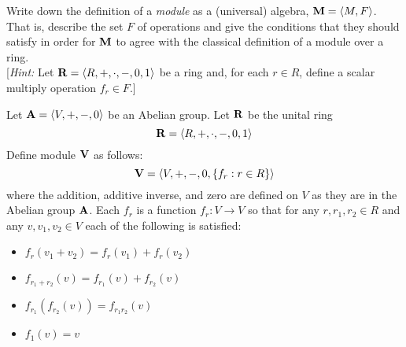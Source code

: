 \begin{problem}
Write down the definition of a \emph{module} as a (universal) algebra, 
$\mathbf{M} = \langle M, F\rangle$.  That is, describe the set $F$ of operations and 
give the conditions that they should satisfy in order for $\mathbf{M}$ to 
agree with the classical definition of a module over a ring.\\[4pt]
[{\it Hint:} Let $\mathbf{R} = \langle R, +, \cdot, -, 0, 1\rangle$ be a ring and, for each $r\in R$, define a scalar multiply operation $f_r \in F$.]
\end{problem}

\begin{solution}
Let $\mathbf{A} = \langle V, +, -, 0\rangle$ be an Abelian group. 
Let $\mathbf{R}$ be the unital ring 
\[\mathbf{R} = \langle R, +, \cdot, -, 0, 1\rangle\]
Define module $\mathbf{V}$ as follows: 
\[\mathbf{V}=\langle V, +, -, 0, \{f_r: r\in R\}\rangle\] 
where the addition, additive inverse, and zero are defined on $V$ as they are in the Abelian group $\mathbf{A}$.
Each $f_r$ is a function $f_r: V\rightarrow V$ so that for any $r, r_1, r_2\in R$ and any $v, v_1, v_2\in V$ each of the following is satisfied: 
	\begin{itemize}
	\item $f_r(v_1+v_2)=f_r(v_1) + f_r(v_2)$
	\item $f_{r_1+r_2}(v) = f_{r_1}(v) + f_{r_2}(v)$
	\item $f_{r_1}\left(f_{r_2}(v)\right) = f_{r_1r_2} (v)$
	\item $f_1(v) = v$
	\end{itemize}
\end{solution}
\probskip



